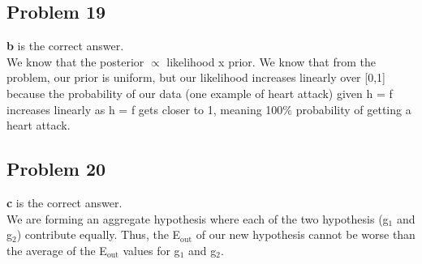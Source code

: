 \documentclass[12 pt]{article}
\begin{document}
	\subsection*{Problem 19}
	\textbf{b} is the correct answer. \\
	We know that the posterior $\propto$ likelihood x prior. We know that from the problem, our prior is uniform, but our likelihood increases linearly over [0,1] because the probability of our data (one example of heart attack) given h = f increases linearly as h = f gets closer to 1, meaning 100$\%$ probability of getting a heart attack.
	
	\subsection*{Problem 20}
	\textbf{c} is the correct answer. \\
	We are forming an aggregate hypothesis where each of the two hypothesis (g$_1$ and g$_2$) contribute equally. Thus, the E$_{\text{out}}$ of our new hypothesis cannot be worse than the average of the E$_{{\text{out}}}$ values for g$_1$ and g$_2$.	 
\end{document}
